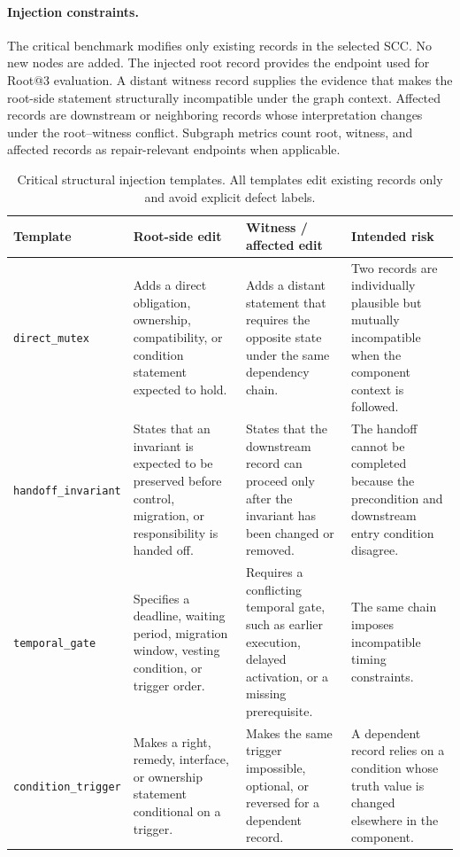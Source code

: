 \documentclass[11pt]{article}
\makeatletter
\newcommand{\rootthree}{Root@3}
\newcommand{\scc}{SCC}
\makeatother
\begin{document}
\paragraph{Injection constraints.}
The critical benchmark modifies only existing records in the selected \scc{}.  No new nodes are added.  The injected root record provides the endpoint used for \rootthree{} evaluation.  A distant witness record supplies the evidence that makes the root-side statement structurally incompatible under the graph context.  Affected records are downstream or neighboring records whose interpretation changes under the root--witness conflict.  Subgraph metrics count root, witness, and affected records as repair-relevant endpoints when applicable. 

\begin{table}[t]
\centering
\scriptsize
\setlength{\tabcolsep}{3pt}
\begin{tabular}{p{}p{}p{}p{}}
\toprule
Template & Root-side edit & Witness / affected edit & Intended risk \\
\midrule
\texttt{direct\_mutex} & Adds a direct obligation, ownership, compatibility, or condition statement expected to hold. & Adds a distant statement that requires the opposite state under the same dependency chain. & Two records are individually plausible but mutually incompatible when the component context is followed. \\
\texttt{handoff\_invariant} & States that an invariant is expected to be preserved before control, migration, or responsibility is handed off. & States that the downstream record can proceed only after the invariant has been changed or removed. & The handoff cannot be completed because the precondition and downstream entry condition disagree. \\
\texttt{temporal\_gate} & Specifies a deadline, waiting period, migration window, vesting condition, or trigger order. & Requires a conflicting temporal gate, such as earlier execution, delayed activation, or a missing prerequisite. & The same chain imposes incompatible timing constraints. \\
\texttt{condition\_trigger} & Makes a right, remedy, interface, or ownership statement conditional on a trigger. & Makes the same trigger impossible, optional, or reversed for a dependent record. & A dependent record relies on a condition whose truth value is changed elsewhere in the component. \\
\bottomrule
\end{tabular}
\caption{Critical structural injection templates.  All templates edit existing records only and avoid explicit defect labels.}
\label{tab:injection_templates}
\end{table}
\end{document}
